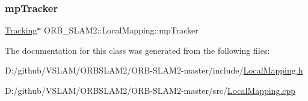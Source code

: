 \mbox{\label{class_o_r_b___s_l_a_m2_1_1_local_mapping_a6b4d311f49979f38d47ed96290255a2f}} 
\subsubsection{\texorpdfstring{mp\+Tracker}{mpTracker}}
{\footnotesize\ttfamily \mbox{\hyperlink{class_o_r_b___s_l_a_m2_1_1_tracking}{Tracking}}$\ast$ O\+R\+B\+\_\+\+S\+L\+A\+M2\+::\+Local\+Mapping\+::mp\+Tracker\hspace{0.3cm}{\ttfamily [protected]}}



The documentation for this class was generated from the following files\+:\begin{DoxyCompactItemize}
\item 
D\+:/github/\+V\+S\+L\+A\+M/\+O\+R\+B\+S\+L\+A\+M2/\+O\+R\+B-\/\+S\+L\+A\+M2-\/master/include/\mbox{\hyperlink{_local_mapping_8h}{Local\+Mapping.\+h}}\item 
D\+:/github/\+V\+S\+L\+A\+M/\+O\+R\+B\+S\+L\+A\+M2/\+O\+R\+B-\/\+S\+L\+A\+M2-\/master/src/\mbox{\hyperlink{_local_mapping_8cpp}{Local\+Mapping.\+cpp}}\end{DoxyCompactItemize}
